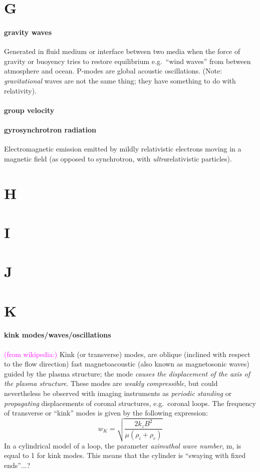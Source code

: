 \documentclass[12pt]{article}
\begin{document}
\section*{G}

\paragraph{gravity waves}
Generated in fluid medium or interface between two media when the
force of gravity or buoyency tries to restore equilibrium
e.g.\ ``wind waves'' from between atmosphere and ocean.
P-modes are global acoustic oscillations.
(Note: \emph{gravitational} waves are not the same thing; they
have something to do with relativity).

\paragraph{group velocity}

\paragraph{gyrosynchrotron radiation}
Electromagnetic emission emitted by mildly relativistic electrons moving
in a magnetic field
(as opposed to synchrotron, with \emph{ultra}relativistic particles).

\section*{H}
\section*{I}
\section*{J}
\section*{K}

\paragraph{kink modes/waves/oscillations}
\textcolor{magenta}{(from wikipedia:)}
Kink (or transverse) modes,
are oblique (inclined with respect to the flow direction)
fast magnetoacoustic
(also known as magnetosonic waves) guided by the plasma structure;
the mode \emph{causes the displacement of the axis of the plasma structure}.
These modes are \emph{weakly compressible}, but could nevertheless be
observed with imaging instruments as \emph{periodic standing}
or \emph{propagating} displacements of coronal structures, e.g.\ coronal loops.
The frequency of transverse or ``kink'' modes is given by the following expression:
    $$ w_K = \sqrt{ \frac{2k_zB^2}{\mu(\rho_i+\rho_e)}  }   $$
In a cylindrical model of a loop,
the parameter \emph{azimuthal wave number},
m, is equal to 1 for kink modes.
This means that the cylinder is ``swaying with fixed ends''$\ldots$?
\end{document}
